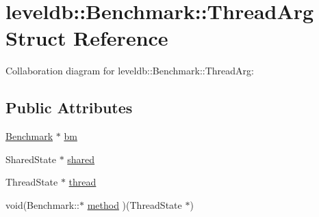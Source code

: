 \hypertarget{structleveldb_1_1_benchmark_1_1_thread_arg}{\section{leveldb\-:\-:Benchmark\-:\-:Thread\-Arg Struct Reference}
\label{structleveldb_1_1_benchmark_1_1_thread_arg}
}


Collaboration diagram for leveldb\-:\-:Benchmark\-:\-:Thread\-Arg\-:
\subsection*{Public Attributes}
\begin{DoxyCompactItemize}
\item 
\hyperlink{classleveldb_1_1_benchmark}{Benchmark} $\ast$ \hyperlink{structleveldb_1_1_benchmark_1_1_thread_arg_a12d3836200f9c5e6495b5adc3626fdfc}{bm}
\item 
Shared\-State $\ast$ \hyperlink{structleveldb_1_1_benchmark_1_1_thread_arg_a655e31754ac547d299f1bccba169414a}{shared}
\item 
Thread\-State $\ast$ \hyperlink{structleveldb_1_1_benchmark_1_1_thread_arg_aad6ba56c77f3da2d369a032e211c92d8}{thread}
\item 
void(Benchmark\-::$\ast$ \hyperlink{structleveldb_1_1_benchmark_1_1_thread_arg_a16b81e6637e6fc22a4bafe8a76d6f39b}{method} )(Thread\-State $\ast$)
\end{DoxyCompactItemize}


